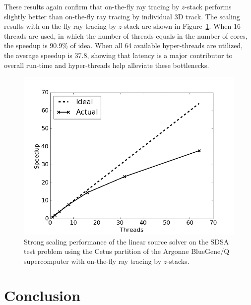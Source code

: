 These results again confirm that on-the-fly ray tracing by $z$-stack performs slightly better than on-the-fly ray tracing by individual 3D track. The scaling results with on-the-fly ray tracing by $z$-stack are shown in Figure~\ref{fig:rt-parallel-ls-cetus}. When 16 threads are used, in which the number of threads equals in the number of cores, the speedup is 90.9\% of idea. When all 64 available hyper-threads are utilized, the average speedup is 37.8, showing that latency is a major contributor to overall run-time and hyper-threads help alleviate these bottlenecks.

\begin{figure}[ht!]
	\centering
	\includegraphics[width=0.75\linewidth]{figures/results/performance/ls-parallel-scaling-stacks-cetus.png}
	\caption{Strong scaling performance of the linear source solver on the SDSA test problem using the Cetus partition of the Argonne BlueGene/Q supercomputer with on-the-fly ray tracing by $z$-stacks.}
	\label{fig:rt-parallel-ls-cetus}
\end{figure}


\section{Conclusion}
\label{sec:ls-conclusion}




